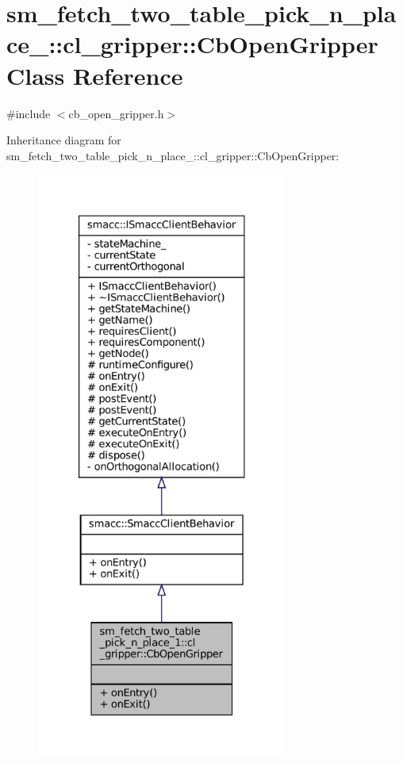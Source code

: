 \hypertarget{classsm__fetch__two__table__pick__n__place__1_1_1cl__gripper_1_1CbOpenGripper}{}\section{sm\+\_\+fetch\+\_\+two\+\_\+table\+\_\+pick\+\_\+n\+\_\+place\+\_\+:\+:cl\+\_\+gripper\+:\+:Cb\+Open\+Gripper Class Reference}
\label{classsm__fetch__two__table__pick__n__place__1_1_1cl__gripper_1_1CbOpenGripper}


{\ttfamily \#include $<$cb\+\_\+open\+\_\+gripper.\+h$>$}



Inheritance diagram for sm\+\_\+fetch\+\_\+two\+\_\+table\+\_\+pick\+\_\+n\+\_\+place\+\_\+:\+:cl\+\_\+gripper\+:\+:Cb\+Open\+Gripper\+:
\nopagebreak
\begin{figure}[H]
\begin{center}
\leavevmode
\includegraphics[height=550pt]{classsm__fetch__two__table__pick__n__place__1_1_1cl__gripper_1_1CbOpenGripper__inherit__graph}
\end{center}
\end{figure}


